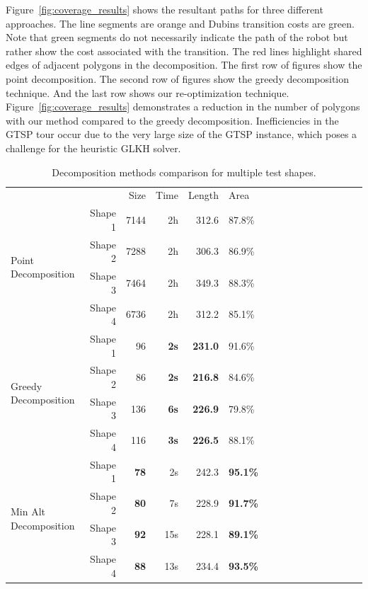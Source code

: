\documentclass[../main.tex]{subfiles}
\begin{document}
Figure~\ref{fig:coverage_results} shows the resultant paths for three different approaches. The line segments are orange and Dubins transition costs are green. Note that green segments do not necessarily indicate the path of the robot but rather show the cost associated with the transition. The red lines highlight shared edges of adjacent polygons in the decomposition. The first row of figures show the point decomposition. The second row of figures show the greedy decomposition technique. And the last row shows our re-optimization technique. Figure~\ref{fig:coverage_results} demonstrates a reduction in the number of polygons with our method compared to the greedy decomposition. Inefficiencies in the GTSP tour occur due to the very large size of the GTSP instance, which poses a challenge for the heuristic GLKH solver.



\begin{table}
	\centering
	\caption{Decomposition methods comparison for multiple test shapes.}
	\label{table:performance}
	\begin{tabular}{@{} l rrrr l rrrr l rrrr l@{}}
		\toprule
		&& Size & Time & Length & Area \\
		\cmidrule{3-6}
		\multirow{4}{*}{Point Decomposition} & Shape 1 & 7144 & 2h & 312.6 & 87.8\%\\
		& Shape 2 & 7288  & 2h & 306.3 & 86.9\%\\
		& Shape 3 & 7464 & 2h & 349.3 & 88.3\%\\
		& Shape 4 & 6736 & 2h & 312.2 & 85.1\%\\
		\midrule
		\multirow{4}{*}{Greedy Decomposition} & Shape 1 & 96 & \bf{2s} & \bf{231.0} & 91.6\%\\
		& Shape 2 & 86 & \bf{2s} & \bf{216.8} & 84.6\%\\
		& Shape 3 & 136 & \bf{6s} & \bf{226.9} & 79.8\%\\
		& Shape 4 & 116 & \bf{3s} & \bf{226.5} & 88.1\%\\
		\midrule
		\multirow{4}{*}{Min Alt Decomposition} & Shape 1 & \bf{78} & 2s & 242.3 & \bf{95.1\%}\\
		& Shape 2 & \bf{80} & 7s & 228.9 & \bf{91.7\%} \\
		& Shape 3 & \bf{92} & 15s & 228.1 & \bf{89.1\%} \\
		& Shape 4 & \bf{88} & 13s & 234.4 & \bf{93.5\%}\\
		\bottomrule

	\end{tabular}
\end{table}
\end{document}
